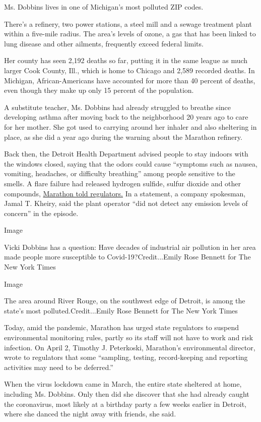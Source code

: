 Ms. Dobbins lives in one of Michigan's most polluted ZIP codes.

There's a refinery, two power stations, a steel mill and a sewage
treatment plant within a five-mile radius. The area's levels of ozone, a
gas that has been linked to lung disease and other ailments, frequently
exceed federal limits.

Her county has seen 2,192 deaths so far, putting it in the same league
as much larger Cook County, Ill., which is home to Chicago and 2,589
recorded deaths. In Michigan, African-Americans have accounted for more
than 40 percent of deaths, even though they make up only 15 percent of
the population.

A substitute teacher, Ms. Dobbins had already struggled to breathe since
developing asthma after moving back to the neighborhood 20 years ago to
care for her mother. She got used to carrying around her inhaler and
also sheltering in place, as she did a year ago during the warning about
the Marathon refinery.

Back then, the Detroit Health Department advised people to stay indoors
with the windows closed, saying that the odors could cause ``symptoms
such as nausea, vomiting, headaches, or difficulty breathing'' among
people sensitive to the smells. A flare failure had released hydrogen
sulfide, sulfur dioxide and other compounds,
\href{https://www.michigan.gov/mienvironment/0,9349,7-385-90161-504479--,00.html}{Marathon
told regulators.} In a statement, a company spokesman, Jamal T. Kheiry,
said the plant operator ``did not detect any emission levels of
concern'' in the episode.

Image

Vicki Dobbins has a question: Have decades of industrial air pollution
in her area made people more susceptible to Covid-19?Credit...Emily Rose
Bennett for The New York Times

Image

The area around River Rouge, on the southwest edge of Detroit, is among
the state's most polluted.Credit...Emily Rose Bennett for The New York
Times

Today, amid the pandemic, Marathon has urged state regulators to suspend
environmental monitoring rules, partly so its staff will not have to
work and risk infection. On April 2, Timothy J. Peterkoski, Marathon's
environmental director, wrote to regulators that some ``sampling,
testing, record-keeping and reporting activities may need to be
deferred.''

When the virus lockdown came in March, the entire state sheltered at
home, including Ms. Dobbins. Only then did she discover that she had
already caught the coronavirus, most likely at a birthday party a few
weeks earlier in Detroit, where she danced the night away with friends,
she said.

